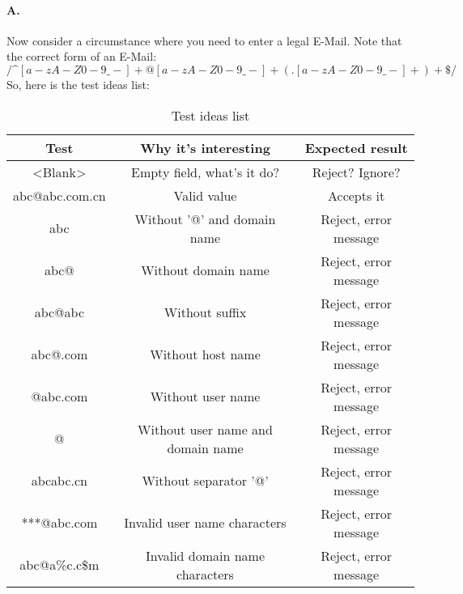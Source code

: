 \paragraph{A.} 
Now consider a circumstance where you need to enter a legal E-Mail. Note that the correct form of an E-Mail:  $$/\^[a-zA-Z0-9\_-]+@[a-zA-Z0-9\_-]+(.[a-zA-Z0-9\_-]+)+\$/$$
So, here is the test ideas list:
\begin{table}[H]
	\caption{Test ideas list}
	\begin{tabular}{|c|c|c|}
		\hline
		Test & Why it's interesting & Expected result \\\hline
		<Blank> & Empty field, what's it do? &  Reject? Ignore? \\\hline
		abc@abc.com.cn & Valid value & Accepts it \\\hline
		abc & Without '@' and domain name & Reject, error message \\\hline
		abc@ & Without domain name & Reject, error message \\\hline
		abc@abc & Without suffix & Reject, error message \\\hline
		abc@.com & Without host name & Reject, error message \\\hline
		@abc.com & Without user name & Reject, error message \\\hline
		@ & Without user name and domain name & Reject, error message \\\hline
		abcabc.cn & Without separator '@' & Reject, error message \\\hline
		***@abc.com & Invalid user name characters & Reject, error message \\\hline
		abc@a\%c.c\$m & Invalid domain name characters & Reject, error message \\\hline
	\end{tabular}
\end{table}